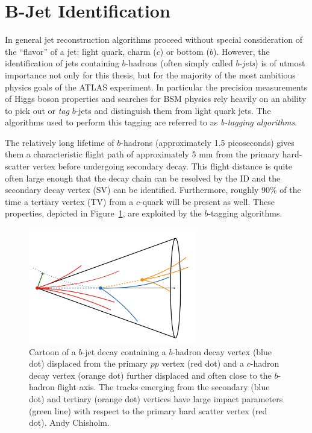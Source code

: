 \section{B-Jet Identification}
\label{sec:btagging}
In general jet reconstruction algorithms proceed without special consideration of the ``flavor'' of a jet: light quark, charm ($c$) or bottom ($b$).
However, the identification of jets containing $b$-hadrons (often simply called $b$-\textit{jets}) is of utmost importance not only for this thesis, but for the majority of the most ambitious physics goals of the ATLAS experiment.
In particular the precision measurements of Higgs boson properties and searches for BSM physics rely heavily on an ability to pick out or \textit{tag} $b$-jets and distinguish them from light quark jets. The algorithms used to perform this tagging are referred to as \textit{b-tagging algorithms}.

The relatively long lifetime of $b$-hadrons (approximately 1.5 picoseconds) gives them a characteristic flight path of approximately 5 mm from the primary hard-scatter vertex before undergoing secondary decay.
This flight distance is quite often large enough that the decay chain can be resolved by the ID and the secondary decay vertex (SV) can be identified.
Furthermore, roughly 90\% of the time a tertiary vertex (TV) from a $c$-quark will be present as well.
These properties, depicted in Figure~\ref{fig:b_decay_cartoon}, are exploited by the $b$-tagging algorithms.

\begin{figure}
	\centering
	\includegraphics[width=0.65\textwidth]{b_decay_cartoon}
	\caption{
	Cartoon of a $b$-jet decay containing a $b$-hadron decay vertex (blue dot) displaced from the primary $pp$ vertex (red dot) and a $c$-hadron decay vertex (orange dot) further displaced and often close to the $b$-hadron flight axis.
	The tracks emerging from the secondary (blue dot) and tertiary (orange dot) vertices have large impact parameters (green line) with respect to the primary hard scatter vertex (red dot).  Andy Chisholm.
	}
	\label{fig:b_decay_cartoon}
\end{figure}

